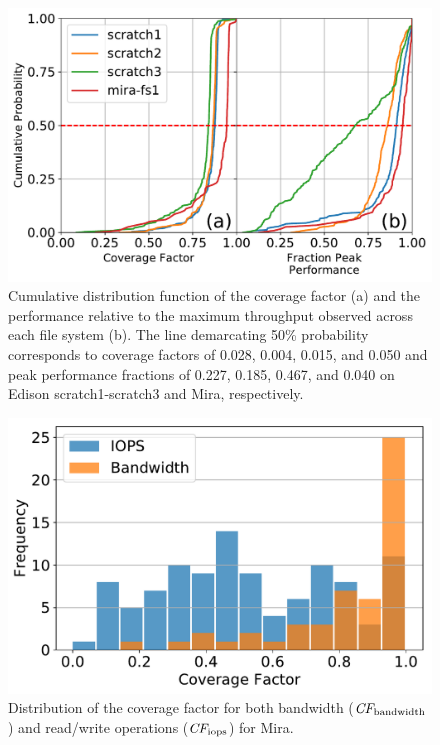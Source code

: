 {\begin{figure}[t]
    \centering
    \includegraphics[width=\columnwidth]{figs/cdf-both.pdf}
    \caption{Cumulative distribution function of the coverage factor (a) and the
    performance relative to the maximum throughput observed across each file system
    (b).  The line demarcating 50\% probability corresponds to coverage factors of
    0.028, 0.004, 0.015, and 0.050 and peak performance fractions of 0.227, 0.185,
    0.467, and 0.040 on Edison scratch1-scratch3 and Mira, respectively.}
    \label{fig:cdfs}
\end{figure}

\begin{figure}[t]
    \centering
    \includegraphics[width=\columnwidth]{figs/hist-cf-bw-and-ops.pdf}
    \caption{Distribution  of the coverage factor for both bandwidth ($\textit{CF}_{\textup{bandwidth}}$) and read/write operations ($\textit{CF}_{\textup{iops}}$) for Mira.
    }
    \label{fig:hist-cf-mira}
\end{figure}

}
